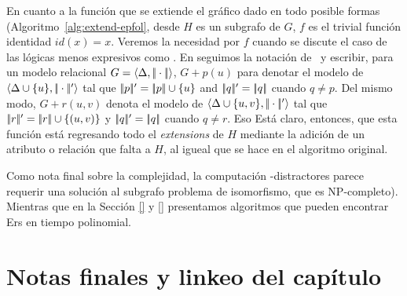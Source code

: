 

En cuanto a la funci\'on que se extiende el gr\'afico dado en todo posible
formas (Algoritmo~\ref{alg:extend-epfol}, desde $ H $
  es un subgrafo de $G$, $f$ es el
trivial funci\'on identidad $\mathit{id(x)} = x$. Veremos la necesidad
por $ f $ cuando se discute el caso de las l\'ogicas menos expresivos como \EL.
En  seguimos la notaci\'on
de~\cite{Krahmer2003} y escribir, para un modelo relacional
$G = \langle \Delta,
|\!|\cdot|\!| \rangle$,  $G + p(u)$ para denotar el modelo de $\langle \Delta
\cup \{u\},|\!|\cdot|\!|' \rangle$ tal que $|\!|p|\!|' = |\!|p|\!|
\cup \{u\}$ and $|\!|q|\!|' = |\!|q|\!|$ cuando  $q \neq p$.
Del mismo modo, $G + r(u,v)$ denota el modelo de $\langle \Delta \cup
\{u,v\},|\!|\cdot|\!|' \rangle$ tal que $|\!|r|\!|' = |\!|r|\!|
\cup \{(u,v)\}$ y $|\!|q|\!|' = |\!|q|\!|$ cuando $q \neq r$. Eso
Est\'a claro, entonces, que esta funci\'on est\'a regresando todo el
\emph{extensions} de $H$ mediante la adici\'on de un atributo o relaci\'on que falta
a $H$, al igueal que se hace en el algoritmo original.

Como nota final sobre la complejidad, la computaci\'on
\EPFOL-distractores parece requerir una soluci\'on al subgrafo
problema de isomorfismo, que es NP-completo). Mientras que en la Secci\'on \ref{} y \ref{} presentamos algoritmos que pueden encontrar Ers en tiempo polinomial.


\section{Notas finales y linkeo del cap\'itulo}
\label{sec:notasFinales}
